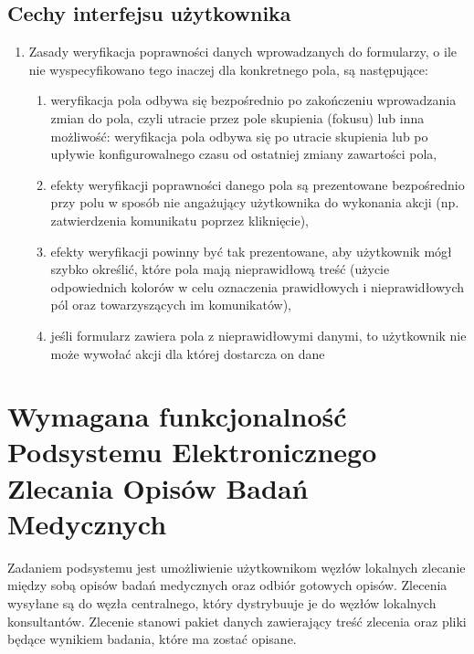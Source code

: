 \documentclass[a4paper]{report}
\begin{document}
\section{Cechy interfejsu użytkownika}

\begin{enumerate}
  \item Zasady weryfikacja poprawności danych wprowadzanych do formularzy, o ile
  nie wyspecyfikowano tego inaczej dla konkretnego pola, są następujące:
  \begin{enumerate}
    \item weryfikacja pola odbywa się bezpośrednio po zakończeniu wprowadzania zmian do pola, czyli utracie przez pole skupienia (fokusu)
    lub inna możliwość: weryfikacja pola odbywa się po utracie skupienia lub po upływie konfigurowalnego czasu od ostatniej zmiany zawartości pola,
    \item efekty weryfikacji poprawności danego pola są prezentowane bezpośrednio przy polu w sposób nie angażujący użytkownika do wykonania
    akcji (np. zatwierdzenia komunikatu poprzez kliknięcie),
    \item efekty weryfikacji powinny być tak prezentowane, aby użytkownik mógł szybko określić, które pola mają
    nieprawidłową treść (użycie odpowiednich kolorów w celu oznaczenia prawidłowych i nieprawidłowych pól oraz towarzyszących
    im komunikatów),
    \item jeśli formularz zawiera pola z nieprawidłowymi danymi, to użytkownik nie może wywołać akcji dla której dostarcza on dane
  \end{enumerate}

\end{enumerate}


\chapter[Podsystem Elektronicznego Zlecania Opisów Badań]{Wymagana funkcjonalność Podsystemu Elektronicznego Zlecania Opisów Badań Medycznych}

Zadaniem podsystemu jest umożliwienie użytkownikom węzłów lokalnych zlecanie między sobą opisów
badań medycznych oraz odbiór gotowych opisów. Zlecenia wysyłane są do węzła centralnego, który
dystrybuuje je do węzłów lokalnych konsultantów. Zlecenie stanowi pakiet danych zawierający
treść zlecenia oraz pliki będące wynikiem badania, które ma zostać opisane. 
\end{document}
